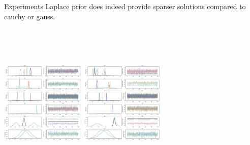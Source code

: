 \documentclass{beamer}
\begin{document}
\begin{frame}{Experiments}
	Laplace prior does indeed provide sparser solutions compared to cauchy or gauss.
	\begin{columns}[t]
		\centering
		\includegraphics[width=4cm,height=7cm]{pres_pics/trace_laplace.png}
		\centering
		\includegraphics[width=4cm,height=7cm]{pres_pics/trace_cauchy.png}
	\end{columns}
\end{frame}
\end{document}
